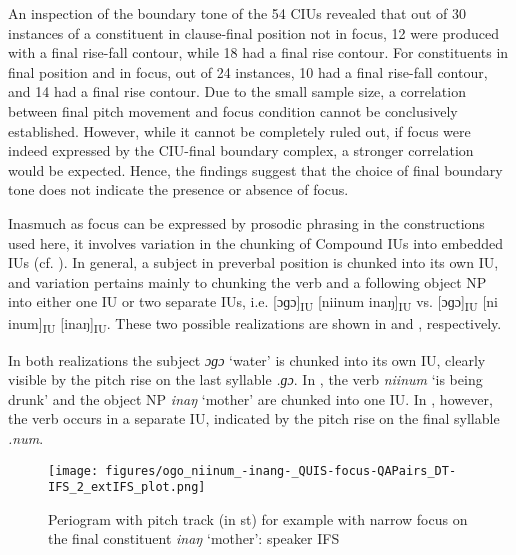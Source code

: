 An inspection of the boundary tone of the 54 CIUs revealed that out of 30 instances of a constituent in clause-final position not in focus, 12 were produced with a final rise-fall contour, while 18 had a final rise contour. For constituents in final position and in focus, out of 24 instances, 10 had a final rise-fall contour, and 14 had a final rise contour. Due to the small sample size, a correlation between final pitch movement and focus condition cannot be conclusively established. However, while it cannot be completely ruled out, if focus were indeed expressed by the CIU-final boundary complex, a stronger correlation would be expected. Hence, the findings suggest that the choice of final boundary tone does not  indicate the presence or absence of focus.

Inasmuch as focus can be expressed by prosodic phrasing in the constructions used here, it involves variation in the chunking of Compound IUs into embedded IUs (cf.  ). In general, a subject in preverbal position is chunked into its own IU, and variation pertains mainly to chunking the verb and a following object NP into either one IU or two separate IUs,  i.e. [ɔɡɔ]\textsubscript{IU} [ni​inum inaŋ]\textsubscript{IU} vs. [ɔɡɔ]\textsubscript{IU} [ni​inum]\textsubscript{IU} [inaŋ]\textsubscript{IU}. 
These two possible realizations are shown in   and  , respectively.



In both realizations the subject \textit{ɔɡɔ} ‘water’ is chunked into its own IU, clearly visible by the pitch rise on the last syllable \textit{.ɡɔ}. In  , the verb \textit{ni​inum} ‘is being drunk’ and the object NP \textit{inaŋ} ‘mother’ are chunked into one IU. In  , however, the verb occurs in a separate IU, indicated by the pitch rise on the final syllable \textit{.num}.


\begin{figure}
	\texttt{[image: figures/ogo\_niinum\_-inang-\_QUIS-focus-QAPairs\_DT-IFS\_2\_extIFS\_plot.png]}
	\caption{Periogram with pitch track (in st) for example  with narrow focus on the final constituent \textit{inaŋ} `mother': speaker IFS  }
	\label{ɔɡɔ_niinum_inang1}
\end{figure}



